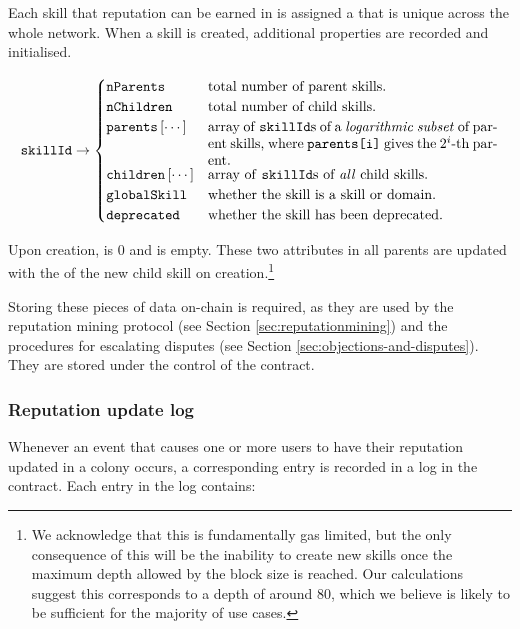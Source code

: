 Each skill that reputation can be earned in is assigned a  that is unique across the whole network. When a skill is created, additional properties are recorded and initialised.

\begin{equation*}
  \ascode{skillId} \rightarrow
  \begin{cases}
    \ascode{nParents} &	\textnormal{total number of parent skills.}\\
    \ascode{nChildren} &	\textnormal{total number of child skills.}\\
    \ascode{parents}\left[\cdots\right] &	\parbox[t]{.6\linewidth}{\textnormal{array of \ascode{skillId}s of a \textit{logarithmic subset} of parent skills, where \ascode{parents[i]} gives the $2^i$-th parent.}}\\
    \ascode{children}\left[\cdots\right] &	\textnormal{array of \ascode{skillId}s of \textit{all} child skills.}\\
    \ascode{globalSkill} &	\textnormal{whether the skill is a skill or domain.}\\
    \ascode{deprecated} &	\textnormal{whether the skill has been deprecated.}
  \end{cases}
\end{equation*}

Upon creation,  is 0 and  is empty. These two attributes in all parents are updated with the  of the new child skill on creation.\footnote{We acknowledge that this is fundamentally gas limited, but the only consequence of this will be the inability to create new skills once the maximum depth allowed by the block size is reached. Our calculations suggest this corresponds to a depth of around 80, which we believe  is likely to be sufficient for the majority of use cases.}

Storing these pieces of data on-chain is required, as they are used by the reputation mining protocol (see Section \ref{sec:reputationmining}) and the procedures for escalating disputes (see Section \ref{sec:objections-and-disputes}). They are stored under the control of the  contract.

\subsubsection{Reputation update log}\label{subsec:reputation-update-log}

Whenever an event that causes one or more users to have their reputation updated in a colony occurs, a corresponding entry is recorded in a log in the  contract. Each entry in the log contains:


